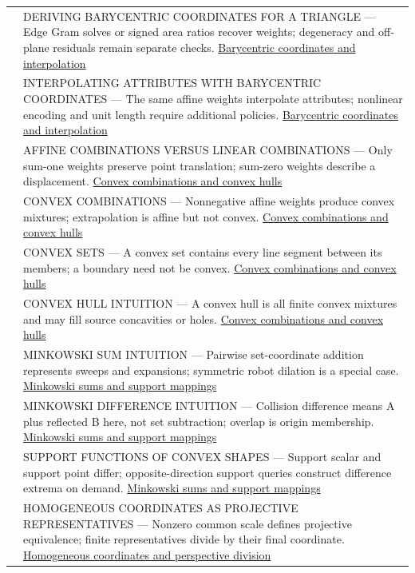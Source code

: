 {\begin{longtable}[]{@{}
  >{\raggedright\arraybackslash}p{}
  >{\raggedright\arraybackslash}p{}@{}}
569 & DERIVING BARYCENTRIC COORDINATES FOR A TRIANGLE --- Edge Gram solves or signed area ratios recover weights; degeneracy and off-plane residuals remain separate checks. \hyperref[appendix-02b9d9a81dca]{Barycentric coordinates and interpolation} \\
570 & INTERPOLATING ATTRIBUTES WITH BARYCENTRIC COORDINATES --- The same affine weights interpolate attributes; nonlinear encoding and unit length require additional policies. \hyperref[appendix-02b9d9a81dca]{Barycentric coordinates and interpolation} \\
571 & AFFINE COMBINATIONS VERSUS LINEAR COMBINATIONS --- Only sum-one weights preserve point translation; sum-zero weights describe a displacement. \hyperref[appendix-0026ec42c9d5]{Convex combinations and convex hulls} \\
572 & CONVEX COMBINATIONS --- Nonnegative affine weights produce convex mixtures; extrapolation is affine but not convex. \hyperref[appendix-0026ec42c9d5]{Convex combinations and convex hulls} \\
573 & CONVEX SETS --- A convex set contains every line segment between its members; a boundary need not be convex. \hyperref[appendix-0026ec42c9d5]{Convex combinations and convex hulls} \\
574 & CONVEX HULL INTUITION --- A convex hull is all finite convex mixtures and may fill source concavities or holes. \hyperref[appendix-0026ec42c9d5]{Convex combinations and convex hulls} \\
575 & MINKOWSKI SUM INTUITION --- Pairwise set-coordinate addition represents sweeps and expansions; symmetric robot dilation is a special case. \hyperref[appendix-215ac7099a82]{Minkowski sums and support mappings} \\
576 & MINKOWSKI DIFFERENCE INTUITION --- Collision difference means A plus reflected B here, not set subtraction; overlap is origin membership. \hyperref[appendix-215ac7099a82]{Minkowski sums and support mappings} \\
577 & SUPPORT FUNCTIONS OF CONVEX SHAPES --- Support scalar and support point differ; opposite-direction support queries construct difference extrema on demand. \hyperref[appendix-215ac7099a82]{Minkowski sums and support mappings} \\
578 & HOMOGENEOUS COORDINATES AS PROJECTIVE REPRESENTATIVES --- Nonzero common scale defines projective equivalence; finite representatives divide by their final coordinate. \hyperref[appendix-cb3b26862282]{Homogeneous coordinates and perspective division} \\

\end{longtable}}
